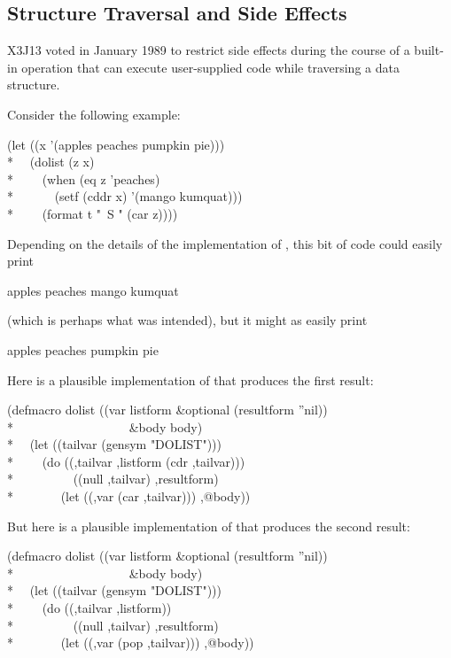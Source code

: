 \begin{new}
\section{Structure Traversal and Side Effects}
\label{STRUCTURE-TRAVERSAL-SECTION}

X3J13 voted in January 1989 
to restrict side effects during the course
of a built-in operation that can execute user-supplied code while
traversing a data structure.

Consider the following example:
\begin{lisp}
(let ((x '(apples peaches pumpkin pie))) \\*
~~(dolist (z x) \\*
~~~~(when (eq z 'peaches) \\*
~~~~~~(setf (cddr x) '(mango kumquat))) \\*
~~~~(format t "~S " (car z))))
\end{lisp}
Depending on the details of the implementation of ,
this bit of code could easily print
\begin{lisp}
apples peaches mango kumquat
\end{lisp}
(which is perhaps what was intended), but it might as easily print
\begin{lisp}
apples peaches pumpkin pie
\end{lisp}
Here is a plausible implementation of  that
produces the first result:
\begin{lisp}
(defmacro dolist ((var listform \&optional (resultform ''nil)) \\*
~~~~~~~~~~~~~~~~~~\&body body) \\*
~~(let ((tailvar (gensym "DOLIST"))) \\*
~~~~{\Xbq}(do ((,tailvar ,listform (cdr ,tailvar))) \\*
~~~~~~~~~((null ,tailvar) ,resultform) \\*
~~~~~~~(let ((,var (car ,tailvar))) ,@body))
\end{lisp}
But here is a plausible implementation of  that
produces the second result:
\begin{lisp}
(defmacro dolist ((var listform \&optional (resultform ''nil)) \\*
~~~~~~~~~~~~~~~~~~\&body body) \\*
~~(let ((tailvar (gensym "DOLIST"))) \\*
~~~~{\Xbq}(do ((,tailvar ,listform)) \\*
~~~~~~~~~((null ,tailvar) ,resultform) \\*
~~~~~~~(let ((,var (pop ,tailvar))) ,@body))
\end{lisp}


\end{new}
